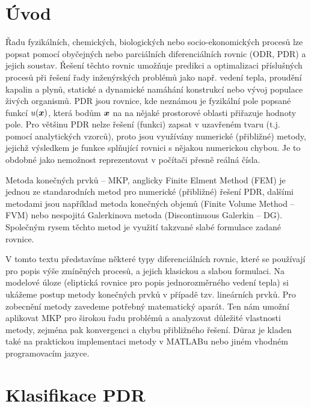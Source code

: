 \section*{Úvod}

Řadu fyzikálních, chemických, biologických nebo socio-ekonomických procesů lze popsat pomocí obyčejných nebo parciálních diferenciálních rovnic (ODR, PDR) a jejich soustav.
Řešení těchto rovnic umožňuje predikci a optimalizaci příslušných procesů při řešení řady inženýrských problémů jako např. vedení tepla, proudění kapalin a plynů, statické a dynamické namáhání konstrukcí nebo vývoj populace živých organismů.
PDR jsou rovnice, kde neznámou je fyzikální pole popsané funkcí $u(\mathbf{\boldsymbol{x}})$, která bodům $\mathbf{\boldsymbol{x}}$ na na nějaké prostorové oblasti přiřazuje hodnoty pole. 
Pro většinu PDR nelze řešení (funkci) zapsat v uzavřeném tvaru (t.j. pomocí analytických vzorců), proto jsou využívány numerické (přibližné) metody, jejichž výsledkem je funkce splňující rovnici 
s nějakou numerickou chybou.
Je to obdobné jako nemožnost reprezentovat v počítači přesně reálná čísla.

Metoda konečných prvků -- MKP, anglicky Finite Elment Method (FEM) je jednou ze standarodních metod pro numerické (přibližné) řešení PDR, dalšími metodami jsou například metoda konečných objemů (Finite Volume Method -- FVM) nebo nespojitá Galerkinova metoda (Discontinuous Galerkin -- DG).
Společným rysem těchto metod je využití takzvané slabé formulace zadané rovnice. 

V tomto textu představíme některé typy diferenciálních rovnic, které se používají pro popis výše zmíněných procesů, a jejich klasickou a slabou formulaci.
Na modelové úloze (eliptická rovnice pro popis jednorozměrného vedení tepla) si ukážeme postup metody konečných prvků v případě tzv. lineárních prvků.
Pro zobecnění metody zavedeme potřebný matematický aparát.
Ten nám umožní aplikovat MKP pro širokou řadu problémů a analyzovat důležité vlastnosti metody, zejména pak konvergenci a chybu přibližného řešení.
Důraz je kladen také na praktickou implementaci metody v MATLABu nebo jiném vhodném programovacím jazyce.




\section{Klasifikace PDR}
